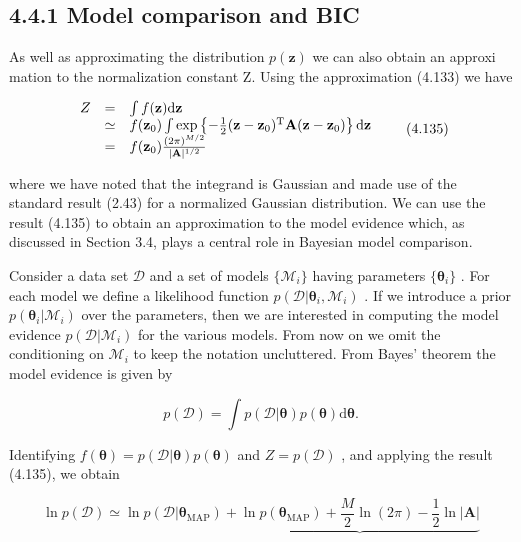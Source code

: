 \documentclass[
  10
]{article}
\begin{document}
\subsection{4.4.1 Model comparison and
BIC}\label{model-comparison-and-bic}

As well as approximating the distribution \(p ( \mathbf { z } )\) we can
also obtain an approxi mation to the normalization constant Z. Using the
approximation (4.133) we have

\[
\begin{array}{r c l} Z & = & \int f (\mathbf {z}) \mathrm{d} \mathbf {z} \\ & \simeq & f (\mathbf {z} _ {0}) \int \exp \left\{- \frac {1}{2} (\mathbf {z} - \mathbf {z} _ {0}) ^ {\mathrm{T}} \mathbf {A} (\mathbf {z} - \mathbf {z} _ {0}) \right\} \mathrm{d} \mathbf {z} \\ & = & f (\mathbf {z} _ {0}) \frac {(2 \pi) ^ {M / 2}}{| \mathbf {A} | ^ {1 / 2}} \end{array}\tag{4.135}
\]

where we have noted that the integrand is Gaussian and made use of the
standard result (2.43) for a normalized Gaussian distribution. We can
use the result (4.135) to obtain an approximation to the model evidence
which, as discussed in Section 3.4, plays a central role in Bayesian
model comparison.

Consider a data set \(\mathcal { D }\) and a set of models
\(\{ \mathcal { M } _ { i } \}\) having parameters
\(\{ \pmb \theta _ { i } \}\) . For each model we define a likelihood
function
\(p ( \mathcal { D } | \pmb { \theta } _ { i } , \mathcal { M } _ { i } )\)
. If we introduce a prior
\(p ( \pmb \theta _ { i } | \mathcal { M } _ { i } )\) over the
parameters, then we are interested in computing the model evidence
\(p ( \mathcal { D } | \mathcal { M } _ { i } )\) for the various
models. From now on we omit the conditioning on
\(\mathcal { M } _ { i }\) to keep the notation uncluttered. From Bayes'
theorem the model evidence is given by

\[
p (\mathcal {D}) = \int p (\mathcal {D} | \boldsymbol {\theta}) p (\boldsymbol {\theta}) \mathrm{d} \boldsymbol {\theta}.\tag{4.136}
\]

Identifying
\(f ( \pmb \theta ) = p ( \mathcal { D } | \pmb \theta ) p ( \pmb \theta )\)
and \(Z = p ( { \mathcal { D } } )\) , and applying the result (4.135),
we obtain

\[
\ln p (\mathcal {D}) \simeq \ln p (\mathcal {D} | \boldsymbol {\theta} _ {\mathrm{MAP}}) + \underbrace {\ln p (\boldsymbol {\theta} _ {\mathrm{MAP}}) + \frac {M}{2} \ln (2 \pi) - \frac {1}{2} \ln | \mathbf {A} |}\tag{4.137}
\]
\end{document}
